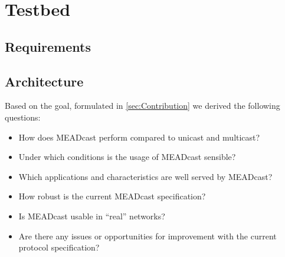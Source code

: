\section{Testbed} %
\label{sec:Testbed_Design}

\subsection{Requirements} %
\label{sub:Requirements}


\subsection{Architecture} %
\label{sub:Architecture}




\newpage\phantom{blabla}
\newpage\phantom{blabla}
Based on the goal, formulated in \autoref{sec:Contribution} we derived the
    following questions:

\begin{itemize}
    \item How does MEADcast perform compared to unicast and multicast?
    \item Under which conditions is the usage of MEADcast sensible?
    \item Which applications and characteristics are well served by MEADcast?
    \item How robust is the current MEADcast specification?
    \item Is MEADcast usable in ``real'' networks?
    \item Are there any issues or opportunities for improvement with the
        current protocol specification?
\end{itemize}

